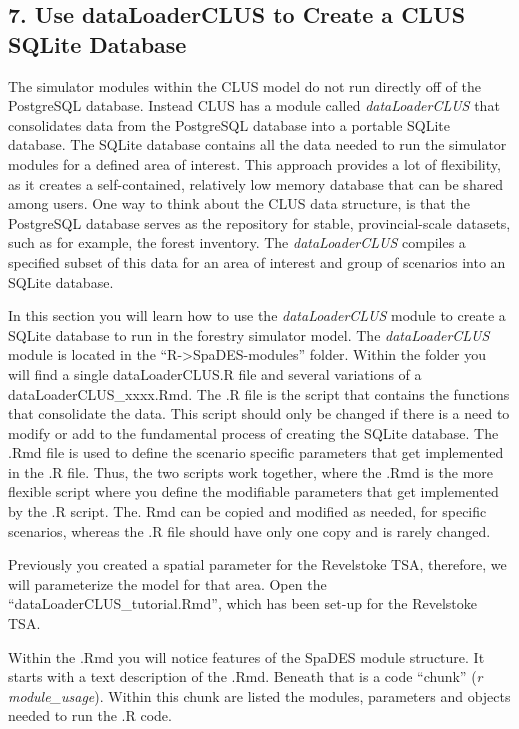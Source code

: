 \documentclass[
]{article}
\begin{document}
\hypertarget{use-dataloaderclus-to-create-a-clus-sqlite-database}{%
\subsection{7. Use dataLoaderCLUS to Create a CLUS SQLite
Database}\label{use-dataloaderclus-to-create-a-clus-sqlite-database}}

The simulator modules within the CLUS model do not run directly off of
the PostgreSQL database. Instead CLUS has a module called
\emph{dataLoaderCLUS} that consolidates data from the PostgreSQL
database into a portable SQLite database. The SQLite database contains
all the data needed to run the simulator modules for a defined area of
interest. This approach provides a lot of flexibility, as it creates a
self-contained, relatively low memory database that can be shared among
users. One way to think about the CLUS data structure, is that the
PostgreSQL database serves as the repository for stable,
provincial-scale datasets, such as for example, the forest inventory.
The \emph{dataLoaderCLUS} compiles a specified subset of this data for
an area of interest and group of scenarios into an SQLite database.

In this section you will learn how to use the \emph{dataLoaderCLUS}
module to create a SQLite database to run in the forestry simulator
model. The \emph{dataLoaderCLUS} module is located in the
``R-\textgreater SpaDES-modules'' folder. Within the folder you will
find a single dataLoaderCLUS.R file and several variations of a
dataLoaderCLUS\_xxxx.Rmd. The .R file is the script that contains the
functions that consolidate the data. This script should only be changed
if there is a need to modify or add to the fundamental process of
creating the SQLite database. The .Rmd file is used to define the
scenario specific parameters that get implemented in the .R file. Thus,
the two scripts work together, where the .Rmd is the more flexible
script where you define the modifiable parameters that get implemented
by the .R script. The. Rmd can be copied and modified as needed, for
specific scenarios, whereas the .R file should have only one copy and is
rarely changed.

Previously you created a spatial parameter for the Revelstoke TSA,
therefore, we will parameterize the model for that area. Open the
``dataLoaderCLUS\_tutorial.Rmd'', which has been set-up for the
Revelstoke TSA.

Within the .Rmd you will notice features of the SpaDES module structure.
It starts with a text description of the .Rmd. Beneath that is a code
``chunk'' (\emph{r module\_usage}). Within this chunk are listed the
modules, parameters and objects needed to run the .R code.
\end{document}
